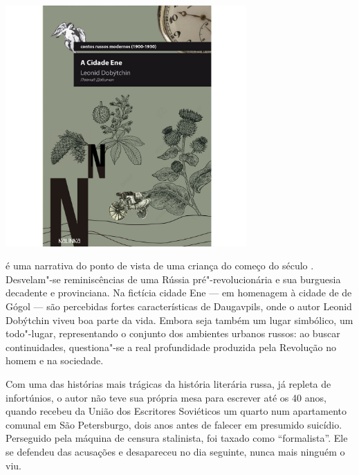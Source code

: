 \begin{center}
\hspace*{.5cm}\includegraphics[width=92mm]{./grid/cidaden.jpg}
\end{center}

\hspace*{-7cm}\hrulefill\hspace*{-7cm}

\medskip

 é uma narrativa do ponto de vista de uma criança do começo do século . Desvelam"-se reminiscências de uma Rússia pré"-revolucionária e sua burguesia decadente e provinciana. Na fictícia cidade Ene --- em homenagem à cidade de {} de Gógol --- são percebidas fortes características de Daugavpils, onde o autor Leonid Dobýtchin viveu boa parte da vida. Embora seja também um lugar simbólico, um todo"-lugar, representando o conjunto dos ambientes urbanos russos: ao buscar continuidades, questiona"-se a real profundidade produzida pela Revolução  no homem e na sociedade.

Com uma das histórias mais trágicas da história literária russa, já repleta de infortúnios, o autor não teve sua própria mesa para escrever até os 40 anos, quando recebeu da União dos Escritores Soviéticos um quarto num apartamento comunal em São Petersburgo, dois anos antes de falecer em presumido suicídio. Perseguido pela máquina de censura stalinista, foi taxado como “formalista”. Ele se defendeu das acusações e desapareceu no dia seguinte, nunca mais ninguém o viu.

\vfill

\hspace*{-.4cm}\begin{minipage}[c]{.5\linewidth}
\small{
{}}
\end{minipage}


